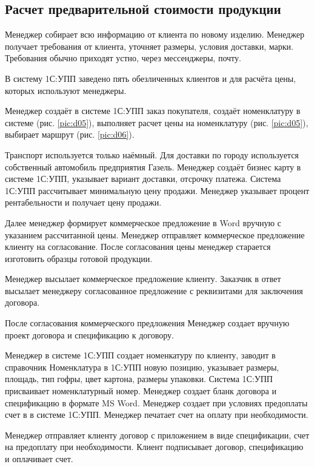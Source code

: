 \newpage
\subsection{Расчет предварительной стоимости продукции}
\label{bp:calculation}


Менеджер собирает всю информацию от клиента по новому изделию. 
Менеджер получает требования от клиента, уточняет размеры, условия доставки, марки. Требования обычно приходят устно, через мессенджеры, почту.

В систему 1С:УПП заведено пять обезличенных клиентов и для расчёта цены, которых используют менеджеры.

Менеджер создаёт в системе  1С:УПП  заказ покупателя, создаёт номенклатуру в системе (рис. \ref{pic:d05}), выполняет расчет цены на номенклатуру (рис. \ref{pic:d05}),  выбирает маршрут (рис. \ref{pic:d06}).

Транспорт используется только наёмный.  Для доставки по городу используется собственный автомобиль предприятия Газель.
Менеджер создаёт бизнес карту в системе 1С:УПП,  указывает вариант доставки, отсрочку платежа. Система 1С:УПП рассчитывает минимальную цену продажи. Менеджер указывает процент рентабельности и получает цену продажи.

Далее менеджер формирует коммерческое предложение в Word вручную с указанием рассчитанной цены.
Менеджер отправляет коммерческое предложение клиенту на согласование.
После согласования цены менеджер старается изготовить образцы готовой продукции.




Менеджер высылает коммерческое предложение клиенту.  Заказчик в ответ высылает менеджеру согласованное предложение с реквизитами для заключения договора. 

После согласования коммерческого предложения Менеджер 
создает вручную проект договора и  спецификацию к договору. 

Менеджер в системе 1С:УПП создает номенкатуру по клиенту, заводит в справочник Номенклатура в 1С:УПП новую позицию, указывает размеры, площадь, тип гофры, цвет картона, размеры упаковки.
Система 1С:УПП присваивает номенклатурный номер.
Менеджер создает бланк договора и спецификацию в формате MS Word. 
Менеджер создает при условиях предоплаты счет в в системе 1С:УПП. 
Менеджер печатает счет на оплату при необходимости.

Менеджер отправляет клиенту договор с приложением в виде спецификации, счет на предоплату при необходимости.
Клиент подписывает договор, спецификацию и оплачивает счет.



